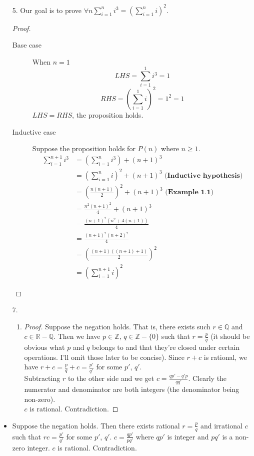 \documentclass{article}
\begin{document}
\begin{itemize}
\item [5.]
  Our goal is to prove $\forall n
  \sum_{i=1}^{n}i^3=(\sum_{i=1}^ni)^2$.
  \begin{proof}
    \begin{description}
    \item[Base case]
      When $n=1$
      \[LHS=\sum_{i=1}^1i^3=1\]
      \[RHS=(\sum_{i=1}^1i)^2=1^2=1\]
      $LHS=RHS$, the proposition holds.
    \item[Inductive case]
      Suppose the proposition holds for $P(n)$ where $n\geq 1$. 
      \begin{equation*}
        \begin{split}
          \sum_{i=1}^{n+1}i^3
          &= (\sum_{i=1}^{n}i^3) + (n+1)^3\\
          &= (\sum_{i=1}^{n}i)^2 + (n+1)^3 \textbf{ (Inductive
            hypothesis)}\\ 
          &= (\frac{n(n+1)}{2})^2 + (n+1)^3 \textbf{ (Example 1.1)}\\
          &= \frac{n^2(n+1)^2}{4} + (n+1)^3\\
          &= \frac{(n+1)^2(n^2+4(n+1))}{4}\\
          &= \frac{(n+1)^2(n+2)^2}{4}\\
          &= (\frac{(n+1)((n+1)+1)}{2})^2\\
          &= (\sum_{i=1}^{n+1}i)^2
        \end{split}
      \end{equation*}
    \end{description}
  \end{proof}
\item [7.]
  \begin{enumerate}[label=\alph*.]
  \item
    \begin{proof}
      Suppose the negation holds. That is, there exists such $r \in
      \mathbb{Q}$ and $c \in \mathbb{R}-\mathbb{Q}$. Then we have $p
      \in \mathbb{Z}$, $q \in \mathbb{Z}-\{0\}$ such that $r =
      \frac{p}{q}$ (it should be obvious what $p$ and $q$ belongs to
      and that they're closed under certain operations. I'll omit
      those later to be concise).
      Since $r+c$ is rational, we have $r+c =
      \frac{p}{q}+c=\frac{p'}{q'}$ for some $p'$, $q'$.\\
      Subtracting $r$ to the other side and we get $c =
      \frac{qp'-q'p}{qq'}$. Clearly the numerator and denominator are
      both integers (the denominator being non-zero).\\
      $c$ is rational. Contradiction.
    \end{proof}

  \end{enumerate}
\item Suppose the negation holds. Then there exists rational $r=\frac{p}{q}$
  and irrational $c$ such that $rc = \frac{p'}{q'}$ for some $p'$,
  $q'$.
  $c=\frac{qp'}{pq'}$ where $qp'$ is integer and $pq'$ is a non-zero
  integer. $c$ is rational. Contradiction.
\end{itemize}
\end{document}
